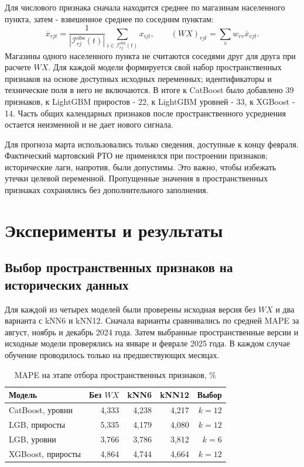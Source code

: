 \documentclass[12pt, a4paper]{article}
\newcommand{\tablesource}[1]{\par\vspace{1mm}{\footnotesize Источник: #1.}}
\begin{document}
Для числового признака сначала находится среднее по магазинам населенного пункта, затем - взвешенное среднее по соседним пунктам:
\begin{equation}
\overline x_{rjt}=\frac{1}{|\mathcal I_{rj}^{\mathrm{obs}}(t)|}
\sum_{i\in\mathcal I_{rj}^{\mathrm{obs}}(t)}x_{ijt}, \qquad
(WX)_{rjt}=\sum_v w_{rv}\overline x_{vjt}.
\end{equation}
Магазины одного населенного пункта не считаются соседями друг для друга при расчете $WX$.
Для каждой модели формируется свой набор пространственных признаков на основе доступных исходных переменных;
идентификаторы и технические поля в него не включаются.
В итоге к CatBoost было добавлено 39 признаков, к LightGBM приростов - 22, к LightGBM уровней - 33, к XGBoost - 14.
Часть общих календарных признаков после пространственного усреднения остается неизменной и не дает нового сигнала.

Для прогноза марта использовались только сведения, доступные к концу февраля.
Фактический мартовский РТО не применялся при построении признаков; исторические лаги, напротив, были допустимы.
Это важно, чтобы избежать утечки целевой переменной. Пропущенные значения в пространственных признаках сохранялись без дополнительного заполнения.

\clearpage

\section*{Эксперименты и результаты}

\subsection*{Выбор пространственных признаков на исторических данных}

Для каждой из четырех моделей были проверены исходная версия без $WX$ и два варианта с kNN6 и kNN12.
Сначала варианты сравнивались по средней MAPE за август, ноябрь и декабрь 2024 года.
Затем выбранные пространственные версии и исходные модели проверялись на январе и феврале 2025 года.
В каждом случае обучение проводилось только на предшествующих месяцах.

\begin{table}[H]
\centering
\footnotesize
\caption{MAPE на этапе отбора пространственных признаков, \%}
\begin{tabularx}{\textwidth}{Xrrrr}\toprule
Модель & Без $WX$ & kNN6 & kNN12 & Выбор\\\midrule
CatBoost, уровни & 4,333 & 4,238 & 4,217 & $k=12$ \\
LGB, приросты & 5,335 & 4,179 & 4,080 & $k=12$ \\
LGB, уровни & 3,766 & 3,786 & 3,812 & $k=6$ \\
XGBoost, приросты & 4,864 & 4,744 & 4,664 & $k=12$ \\
\bottomrule\end{tabularx}
\tablesource{расчеты авторов по данным X5 Group и GeoNames}
\end{table}
\end{document}
